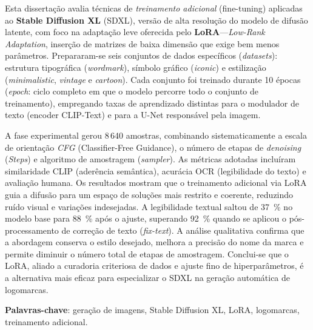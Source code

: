 \documentclass[12pt, %
openright, 
oneside, %
a4paper,    %
brazil]{facom-ufu-abntex2}
\begin{document}
\begin{resumo}
    Esta dissertação avalia técnicas de \emph{treinamento adicional} (fine-tuning) aplicadas ao \textbf{Stable Diffusion XL} (SDXL), versão de alta resolução do modelo de difusão latente, com foco na adaptação leve oferecida pelo \textbf{LoRA}—\emph{Low-Rank Adaptation}, inserção de matrizes de baixa dimensão que exige bem menos parâmetros. Prepararam-se seis conjuntos de dados específicos (\emph{datasets}): estrutura tipográfica (\emph{wordmark}), símbolo gráfico (\emph{iconic}) e estilização (\emph{minimalistic}, \emph{vintage} e \emph{cartoon}). Cada conjunto foi treinado durante 10 épocas (\emph{epoch}: ciclo completo em que o modelo percorre todo o conjunto de treinamento), empregando taxas de aprendizado distintas para o modulador de texto (encoder CLIP-Text) e para a U-Net responsável pela imagem.

    A fase experimental gerou 8\,640 amostras, combinando sistematicamente a escala de orientação \emph{CFG} (Classifier-Free Guidance), o número de etapas de \emph{denoising} (\emph{Steps}) e algoritmo de amostragem (\emph{sampler}). As métricas adotadas incluíram similaridade CLIP (aderência semântica), acurácia OCR (legibilidade do texto) e avaliação humana. Os resultados mostram que o treinamento adicional via LoRA guia a difusão para um espaço de soluções mais restrito e coerente, reduzindo ruído visual e variações indesejadas. A legibilidade textual saltou de 37~\% no modelo base para 88~\% após o ajuste, superando 92~\% quando se aplicou o pós-processamento de correção de texto (\emph{fix-text}). A análise qualitativa confirma que a abordagem conserva o estilo desejado, melhora a precisão do nome da marca e permite diminuir o número total de etapas de amostragem. Conclui-se que o LoRA, aliado a curadoria criteriosa de dados e ajuste fino de hiperparâmetros, é a alternativa mais eficaz para especializar o SDXL na geração automática de logomarcas.  
    
    \vspace{\onelineskip}
    
    \noindent
    \textbf{Palavras-chave}: geração de imagens, Stable Diffusion XL, LoRA, logomarcas, treinamento adicional.
 \end{resumo}


\listoffigures*
\cleardoublepage


\listoftables*
\cleardoublepage
\end{document}
